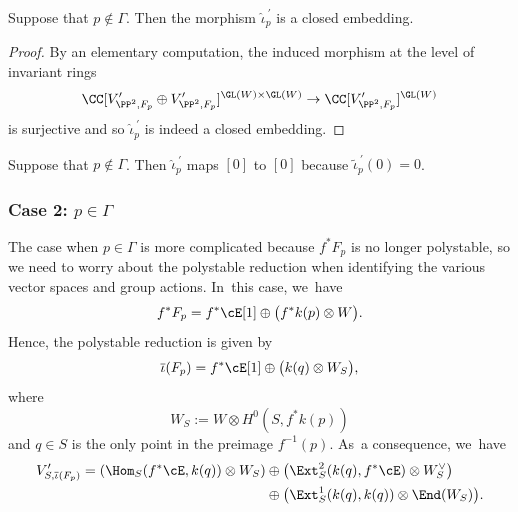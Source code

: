 \begin{lemm}\label{lem:PointIsNotInGamma}
Suppose that $p\notin \mathsf{\Gamma}$.
Then the morphism $\widehat{\iota}_p^{\ \prime}$ is a closed embedding.
\end{lemm}

\begin{proof}
By an elementary computation, the induced morphism at the level of invariant rings
\[
\CC[V'_{\PP^2,F_p}\oplus V'_{\PP^2,F_p}]^{\GL(W) \times \GL(W)} \to \CC[V'_{\PP^2,F_p}]^{\GL(W)}
\]
is surjective and so $\widehat{\iota}_p^{\ \prime}$ is indeed a closed embedding.
\end{proof}

\begin{rema}\label{rmk:0Case1}
Suppose that $p\notin \mathsf{\Gamma}$.
Then $\widehat{\iota}_p^{\ \prime}$ maps $[0]$ to $[0]$ because $\widetilde{\iota}_p^{\ \prime}(0)=0$.
\end{rema}

\subsubsection*{Case 2: $p\in\mathsf{\Gamma}$} The case when $p\in\mathsf{\Gamma}$ is more complicated because $f^*F_p$ is no longer polystable, so we need to worry about the polystable reduction when identifying the various vector spaces and group actions. In~this case, we~have
\[
f^*F_p = f^*\cE[1] \oplus \bigl(f^*k(p) \otimes W\bigr).
\]
Hence, the polystable reduction is given by
\[
\overline{\iota}(F_p) = f^*\cE[1] \oplus \bigl(k(q) \otimes W_S\bigr),
\]
where
\begin{equation*}\label{eq:WS}
W_S:=W\otimes H^0(S,f^*k(p))
\end{equation*}
and $q\in S$ is the only point in the preimage $f^{-1}(p)$. As~a consequence, we~have
\begin{equation}\label{eq:VSprime}
\begin{split}
V'_{S,\overline{\iota}(F_p)} = \left(\Hom_{S}(f^*\cE,k(q))\otimes W_S\right) &\oplus \left(\Ext^2_{S}(k(q),f^*\cE)\otimes W_S^\vee\right)\\
&\oplus \bigl(\Ext^1_{S}(k(q),k(q))\otimes \End(W_S)\bigr).
\end{split}
\end{equation}

